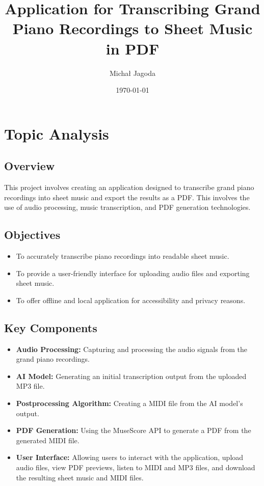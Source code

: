 \documentclass{article}
\title{Application for Transcribing Grand Piano Recordings to Sheet Music in PDF}
\author{Michał Jagoda}
\date{\today}
\begin{document}
\maketitle

\tableofcontents

\section{Topic Analysis}

\subsection{Overview}
This project involves creating an application designed to transcribe grand piano recordings into sheet music and export the results as a PDF. This involves the use of audio processing, music transcription, and PDF generation technologies.

\subsection{Objectives}
\begin{itemize}
    \item To accurately transcribe piano recordings into readable sheet music.
    \item To provide a user-friendly interface for uploading audio files and exporting sheet music.
    \item To offer offline and local application for accessibility and privacy reasons.
\end{itemize}

\subsection{Key Components}
\begin{itemize}
    \item \textbf{Audio Processing:} Capturing and processing the audio signals from the grand piano recordings.
    \item \textbf{AI Model:} Generating an initial transcription output from the uploaded MP3 file.
    \item \textbf{Postprocessing Algorithm:} Creating a MIDI file from the AI model's output.
    \item \textbf{PDF Generation:} Using the MuseScore API to generate a PDF from the generated MIDI file.
    \item \textbf{User Interface:} Allowing users to interact with the application, upload audio files, view PDF previews, listen to MIDI and MP3 files, and download the resulting sheet music and MIDI files.
\end{itemize}
\end{document}
